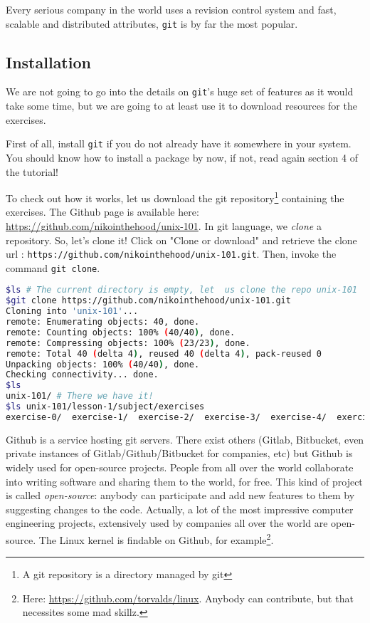 \documentclass[12pt]{article}
\begin{document}
Every serious company in the world uses a revision control system and fast, scalable and distributed attributes, \texttt{git} is by far the most popular.

\subsection{Installation}

We are not going to go into the details on \texttt{git}'s huge set of features as it would take some time, but we are going to at least use it to download resources for the exercises.

First of all, install \texttt{git} if you do not already have it somewhere in your system. You should know how to install a package by now, if not, read again section 4 of the tutorial!

To check out how it works, let us download the git repository\footnote{A git repository is a directory managed by git} containing the exercises. The Github page is available here: \url{https://github.com/nikointhehood/unix-101}. In git language, we \textit{clone} a repository. So, let's clone it! Click on "Clone or download" and retrieve the clone url : \texttt{https://github.com/nikointhehood/unix-101.git}. Then, invoke the command \texttt{git clone}.

\begin{lstlisting}[language=bash]
$ls # The current directory is empty, let  us clone the repo unix-101
$git clone https://github.com/nikointhehood/unix-101.git
Cloning into 'unix-101'...
remote: Enumerating objects: 40, done.
remote: Counting objects: 100% (40/40), done.
remote: Compressing objects: 100% (23/23), done.
remote: Total 40 (delta 4), reused 40 (delta 4), pack-reused 0
Unpacking objects: 100% (40/40), done.
Checking connectivity... done.
$ls
unix-101/ # There we have it!
$ls unix-101/lesson-1/subject/exercises
exercise-0/  exercise-1/  exercise-2/  exercise-3/  exercise-4/  exercise-5/  exercise-6/  exercise-7/  tests_framework.py
\end{lstlisting}

Github is a service hosting git servers. There exist others (Gitlab, Bitbucket, even private instances of Gitlab/Github/Bitbucket for companies, etc) but Github is widely used for open-source projects.
People from all over the world collaborate into writing software and sharing them to the world, for free. This kind of project is called \textit{open-source}: anybody can participate and add new features to them by suggesting changes to the code.
Actually, a lot of the most impressive computer engineering projects, extensively used by companies all over the world are open-source. The Linux kernel is findable on Github, for example\footnote{Here: \url{https://github.com/torvalds/linux}. Anybody can contribute, but that necessites some mad skillz.}.
\end{document}
